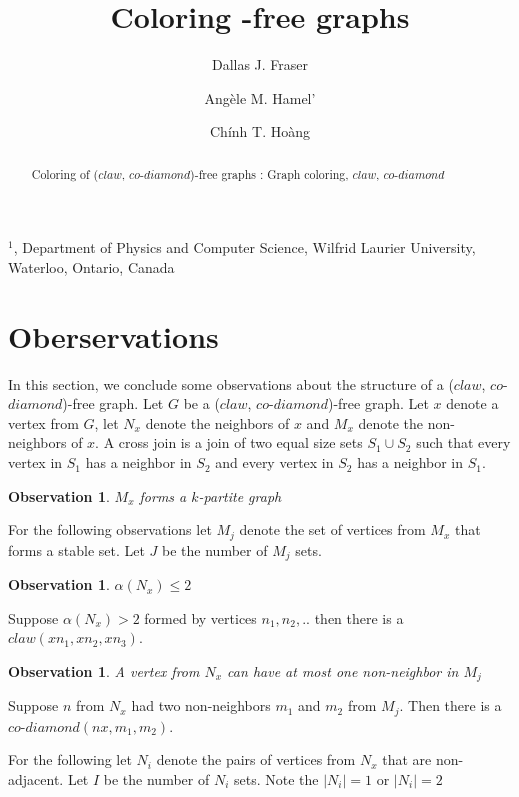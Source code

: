 \documentclass[12pt]{article}
\title{Coloring {\CCD}-free graphs}
\author{
	Dallas J. Fraser\inst{1}
	\and Ang\`ele M. Hamel'\inst{1}
	\and Ch\'inh T. Ho\`ang\inst{1}
}
\newtheorem{Observation}[Theorem]{Observation}
\def\inst#1{$^{#1}$}
\def\CCD{($claw$, $co$-$diamond$)}
\begin{document}
\maketitle

\begin{center}
{\footnotesize

\inst{1}, Department of Physics and Computer Science, Wilfrid Laurier
University, \\Waterloo, Ontario, Canada}

\end{center}

\begin{abstract}
Coloring of {\CCD}-free graphs
: Graph coloring, $claw$, $co$-$diamond$
\end{abstract}

\section{Oberservations}\label{sec:observations}
In this section, we conclude some observations about the structure of a {\CCD}-free graph. Let $G$ be a {\CCD}-free graph. Let $x$ denote a vertex from $G$, let $N_x$ denote the neighbors of $x$ and $M_x$ denote the non-neighbors of $x$.
A cross join is a join of two equal size sets $S_1 \cup S_2$ such that every vertex in $S_1$ has a neighbor in $S_2$ and every vertex in $S_2$ has a neighbor in $S_1$.

\begin{Observation}\label{obs:mx-k-partite}
$M_x$ forms a $k$-partite graph
\end{Observation}
For the following observations let $M_j$ denote the set of vertices from $M_x$ that forms a stable set. Let $J$ be the number of $M_j$ sets.

\begin{Observation}\label{obs:alpha-nx}
$\alpha(N_x) \leq 2$
\end{Observation}
 Suppose $\alpha(N_x) > 2$ formed by vertices $n_1,n_2, ..$ then there is a $claw (xn_1, xn_2, xn_3)$.

\begin{Observation}\label{obs:nx-mj}
A vertex from $N_x$ can have at most one non-neighbor in $M_j$
\end{Observation}
 Suppose $n$ from $N_x$ had two non-neighbors $m_1$ and $m_2$ from $M_j$. Then there is a $co$-$diamond (nx, m_1, m_2)$.

For the following let $N_i$ denote the pairs of vertices from $N_x$ that are non-adjacent. Let $I$ be the number of $N_i$ sets. Note the $|N_i| = 1$ or $|N_i| = 2$
\end{document}
